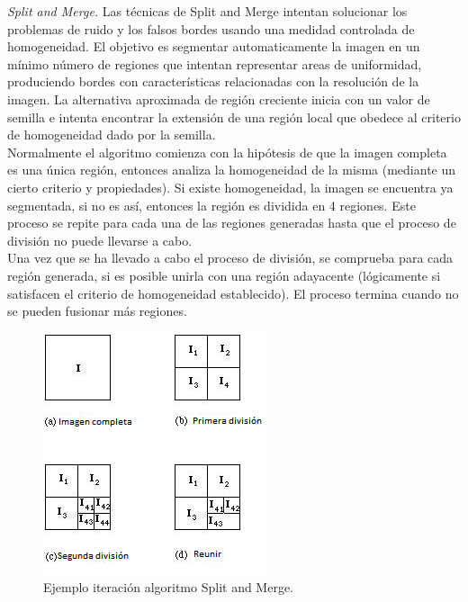 \documentclass[12pt]{report}
\begin{document}
\textit{Split and Merge.}
Las técnicas de Split and Merge intentan solucionar los problemas de ruido y los falsos bordes usando una medidad controlada de homogeneidad.
El objetivo es segmentar automaticamente la imagen en un mínimo número de regiones que intentan representar areas de uniformidad, produciendo bordes con características relacionadas con la resolución de la imagen. La alternativa aproximada de región creciente inicia con un valor de semilla e intenta encontrar la extensión de una región local que obedece al criterio de homogeneidad dado por la semilla.\\
Normalmente el algoritmo comienza con la hipótesis de que la imagen completa es una única región, entonces analiza la homogeneidad de la misma (mediante un cierto criterio y propiedades). Si existe homogeneidad, la imagen se encuentra ya segmentada, si no es así, entonces la región es dividida en 4 regiones.
Este proceso se repite para cada una de las regiones generadas hasta que el proceso de división no puede llevarse a cabo.\\
Una vez que se ha llevado a cabo el proceso de división, se comprueba para cada región generada, si es posible unirla con una región adayacente (lógicamente si satisfacen el criterio de homogeneidad establecido). El proceso termina cuando no se pueden fusionar más regiones.\cite{split}

\begin{figure}[H]
\centering
\includegraphics[width = 7 cm, height = 7 cm]{split}
\caption{Ejemplo iteración algoritmo Split and Merge.}
\end{figure}
\end{document}
